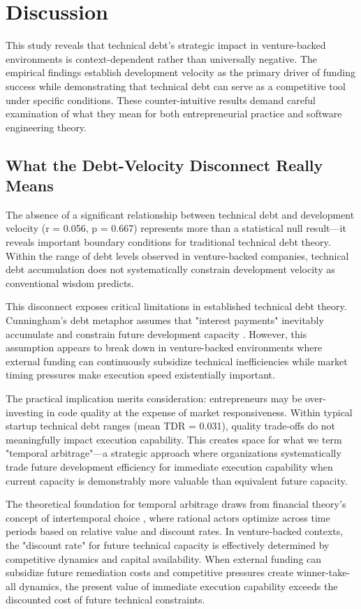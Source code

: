 \chapter{Discussion}\label{sec:discussion}

This study reveals that technical debt's strategic impact in venture-backed environments is context-dependent rather than universally negative. The empirical findings establish development velocity as the primary driver of funding success while demonstrating that technical debt can serve as a competitive tool under specific conditions. These counter-intuitive results demand careful examination of what they mean for both entrepreneurial practice and software engineering theory.

\section{What the Debt-Velocity Disconnect Really Means}

The absence of a significant relationship between technical debt and development velocity (r = 0.056, p = 0.667) represents more than a statistical null result—it reveals important boundary conditions for traditional technical debt theory. Within the range of debt levels observed in venture-backed companies, technical debt accumulation does not systematically constrain development velocity as conventional wisdom predicts.

This disconnect exposes critical limitations in established technical debt theory. Cunningham's debt metaphor assumes that "interest payments" inevitably accumulate and constrain future development capacity \citep{cunningham1992wycash}. However, this assumption appears to break down in venture-backed environments where external funding can continuously subsidize technical inefficiencies while market timing pressures make execution speed existentially important.

The practical implication merits consideration: entrepreneurs may be over-investing in code quality at the expense of market responsiveness. Within typical startup technical debt ranges (mean \ac{TDR} = 0.031), quality trade-offs do not meaningfully impact execution capability. This creates space for what we term "temporal arbitrage"—a strategic approach where organizations systematically trade future development efficiency for immediate execution capability when current capacity is demonstrably more valuable than equivalent future capacity.

The theoretical foundation for temporal arbitrage draws from financial theory's concept of intertemporal choice \citep{fisher1930theory}, where rational actors optimize across time periods based on relative value and discount rates. In venture-backed contexts, the "discount rate" for future technical capacity is effectively determined by competitive dynamics and capital availability. When external funding can subsidize future remediation costs and competitive pressures create winner-take-all dynamics, the present value of immediate execution capability exceeds the discounted cost of future technical constraints.

